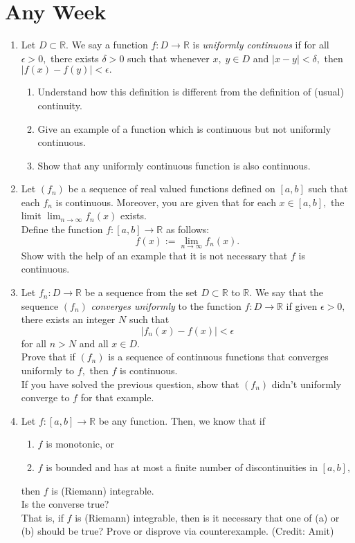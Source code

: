 \documentclass{article}
\begin{document}
\section{Any Week}
\begin{enumerate} 
	\item Let $D \subset \mathbb{R}.$ We say a function $f : D \to \mathbb{R}$ is \emph{uniformly continuous} if for all $\epsilon > 0,$ there exists $\delta > 0$ such that whenever $x,\;y \in D$ and $|x - y| < \delta,$ then $|f(x) - f(y)| < \epsilon.$
	\begin{enumerate} 
		\item Understand how this definition is different from the definition of (usual) continuity.
		\item Give an example of a function which is continuous but not uniformly continuous.
		\item Show that any uniformly continuous function is also continuous.
	\end{enumerate}
	\item Let $(f_n)$ be a sequence of real valued functions defined on $[a, b]$ such that each $f_n$ is continuous. Moreover, you are given that for each $x \in [a, b],$ the limit $\displaystyle\lim_{n\to \infty}f_n(x)$ exists. \\
	Define the function $f : [a, b] \to \mathbb{R}$ as follows:
	\[f(x) := \lim_{n\to \infty}f_n(x).\]
	Show with the help of an example that it is not necessary that $f$ is continuous.
	\item Let $f_n : D \to \mathbb{R}$ be a sequence from the set $D \subset \mathbb{R}$ to $\mathbb{R}.$ We say that the sequence $(f_n)$ \emph{converges uniformly} to the function $f:D \to \mathbb{R}$ if given $\epsilon > 0,$ there exists an integer $N$ such that
	\[|f_n(x) - f(x)| < \epsilon\]
	for all $n > N$ and all $x \in D.$\\
	Prove that if $(f_n)$ is a sequence of continuous functions that converges uniformly to $f,$ then $f$ is continuous.\\
	If you have solved the previous question, show that $(f_n)$ didn't uniformly converge to $f$ for that example.
	\item Let $f:[a, b] \to \mathbb{R}$ be any function. Then, we know that if
	\begin{enumerate} 
		\item $f$ is monotonic, or
		\item $f$ is bounded and has at most a finite number of discontinuities in $[a, b],$
	\end{enumerate}
	then $f$ is (Riemann) integrable.\\
	Is the converse true?\\
	That is, if $f$ is (Riemann) integrable, then is it necessary that one of (a) or (b) should be true? Prove or disprove via counterexample. \hfill (Credit: Amit)
\end{enumerate}
\end{document}
